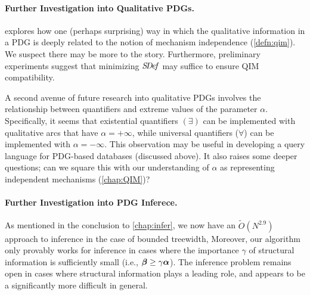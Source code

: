 \paragraph{Further Investigation into Qualitative PDGs.}
 explores how one (perhaps surprising) way in which the qualitative information in a PDG is deeply related to the notion of mechanism independence (\cref{defn:qim}).
We suspect there may be more to the story. 
%
Furthermore, preliminary experiments suggest that minimizing $\mathit{S\mskip-3.5muD\mskip-2.5mue\mskip-1.5muf}$ may suffice to ensure QIM compatibility. 

A second avenue of future research into qualitative PDGs involves the relationship between quantifiers and extreme values of the parameter $\alpha$. 
Specifically, it seems that existential quantifiers $(\exists)$ can be implemented with qualitative arcs that have $\alpha = +\infty$, while universal quantifiers ($\forall$) can be implemented with $\alpha = -\infty$. 
This observation may be useful in developing a query language for PDG-based databases (discussed above).
It also raises some deeper questions;
can we square this with our understanding of $\alpha$ as representing independent mechanisms (\cref{chap:QIM})?


\paragraph{Further Investigation into PDG Inferece.}
As mentioned in the conclusion to \cref{chap:infer}, we now have an $\tilde O(N^{2.9})$ approach to inference in the case of bounded treewidth,
%
Moreover, our algorithm only provably works for inference in cases where 
    the importance $\gamma$ of structural information is sufficiently small
        (i.e., $\boldsymbol\beta \ge \gamma\boldsymbol\alpha$). 
The inference problem remains open in cases where structural information plays a leading role, and appears to be a significantly more difficult in general. 

